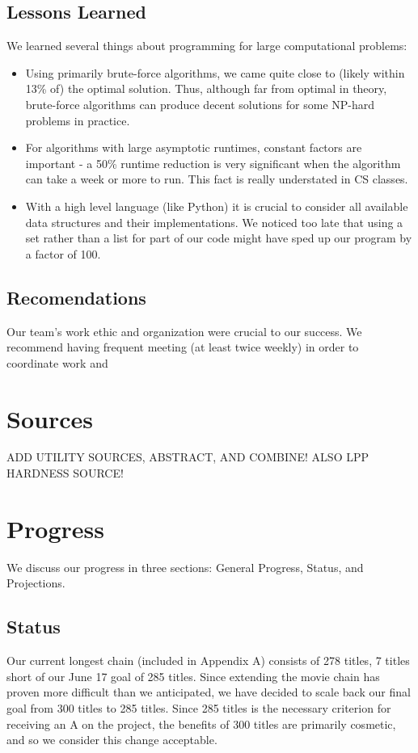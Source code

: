 \documentclass[11pt,english]{article}
\begin{document}
\subsection{Lessons Learned}
We learned several things about programming for large computational problems:
\begin{itemize}
\item Using primarily brute-force algorithms, we came quite close to (likely
within 13\% of) the optimal solution. Thus, although far from optimal in
theory, brute-force algorithms can produce decent solutions for some NP-hard
problems in practice.
\item For algorithms with large asymptotic runtimes, constant factors are
important - a 50\% runtime reduction is very significant when the algorithm can
take a week or more to run. This fact is really understated in CS classes.
\item With a high level language (like Python) it is crucial to consider all
available data structures and their implementations. We noticed too late that
using a set rather than a list for part of our code might have sped up our
program by a factor of 100.
\end{itemize}

\subsection{Recomendations}
Our team's work ethic and organization were crucial to our success. We
recommend having frequent meeting (at least twice weekly) in order to
coordinate work and

\section{Sources}
{\Huge ADD UTILITY SOURCES, ABSTRACT, AND COMBINE! ALSO LPP HARDNESS SOURCE!}

\section{Progress}
We discuss our progress in three sections: General Progress, Status, and
Projections.

\subsection{Status}
Our current longest chain (included in Appendix A) consists of 278 titles,
7 titles short of our June 17 goal of 285 titles. Since extending the movie
chain has proven more difficult than we anticipated, we have decided to scale
back our final goal from 300 titles to 285 titles. Since 285 titles is the
necessary criterion for receiving an A on the project, the benefits of 300
titles are primarily cosmetic, and so we consider this change acceptable.
\end{document}
